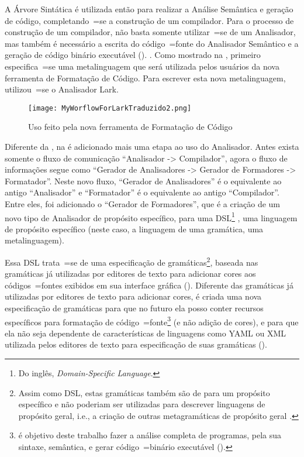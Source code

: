 A Árvore Sintática é utilizada então para realizar a Análise Semântica e
geração de código,
completando~=se a construção de um compilador.
Para o processo de construção de um compilador,
não basta somente utilizar~=se de um Analisador,
mas também é necessário a escrita do código~=fonte do Analisador Semântico e
a geração de código binário executável ().
.
Como mostrado na ,
primeiro especifica~=se uma metalinguagem que será utilizada pelos usuários da nova ferramenta de Formatação de Código.
Para escrever esta nova metalinguagem,
utilizou~=se o Analisador Lark.
\begin{figure}[!htb]
\caption{Uso feito pela nova ferramenta de Formatação de Código}
\label{figure:MyWorflowForLarkTraduzido2}
\centering
\texttt{[image: MyWorflowForLarkTraduzido2.png]}
\end{figure}

Diferente da ,
na  é adicionado mais uma etapa ao uso do Analisador.
Antes exista somente o fluxo de comunicação ``Analisador -> Compilador'',
agora o fluxo de informações segue como ``Gerador de Analisadores -> Gerador de Formadores -> Formatador''.
Neste novo fluxo,
``Gerador de Analisadores'' é o equivalente ao antigo ``Analisador'' e
``Formatador'' é o equivalente ao antigo ``Compilador''.
Entre eles,
foi adicionado o ``Gerador de Formadores'',
que é a criação de um novo tipo de Analisador de propósito específico,
para uma DSL\footnote{%
Do inglês,
\textit{Domain-Specific Language}.
} \cite{areThereDomainSpecificLanguages,yamlSpecificModelChecking},
uma linguagem de propósito específico (neste caso,
a linguagem de uma gramática,
uma metalinguagem).

Essa DSL trata~=se de uma especificação de gramáticas\footnote{
Assim como DSL\s,
estas gramáticas também são de para um propósito específico e
não poderiam ser utilizadas para descrever linguagens de propósito geral,
i.e.,
a criação de outras metagramáticas de propósito geral \cite{turingCompleteRegularLanguages}.
},
baseada nas gramáticas já utilizadas por editores de texto para adicionar cores aos códigos~=fontes exibidos em sua interface gráfica ().
Diferente das gramáticas já utilizadas por editores de texto para adicionar cores,
é criada uma nova especificação de gramáticas para que no futuro ela posso conter recursos específicos para formatação de código~=fonte\footnote{
 é objetivo deste trabalho fazer a análise completa de programas,
pela sua sintaxe, semântica,
e gerar código~=binário executável ().
}
(e não adição de cores),
e para que ela não seja dependente de características de linguagens como YAML ou
XML utilizada pelos editores de texto para especificação de suas gramáticas ().

